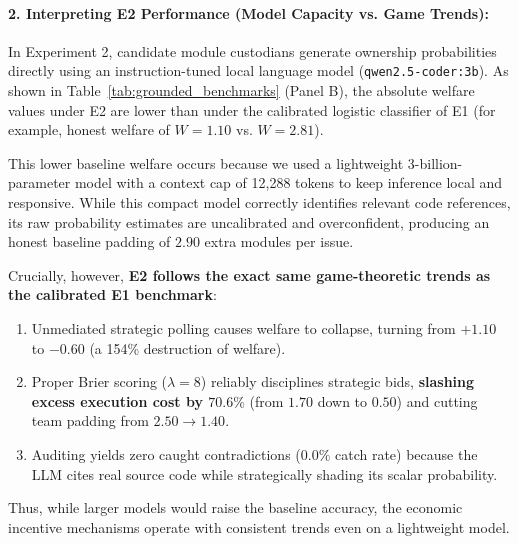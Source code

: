 \documentclass{article}
\theoremstyle{definition}
\begin{document}
\paragraph{2. Interpreting E2 Performance (Model Capacity vs. Game Trends):}
In Experiment 2, candidate module custodians generate ownership probabilities directly using an instruction-tuned local language model (\texttt{qwen2.5-coder:3b}). As shown in Table~\ref{tab:grounded_benchmarks} (Panel B), the absolute welfare values under E2 are lower than under the calibrated logistic classifier of E1 (for example, honest welfare of $W = 1.10$ vs. $W = 2.81$).

This lower baseline welfare occurs because we used a lightweight 3-billion-parameter model with a context cap of 12,288 tokens to keep inference local and responsive. While this compact model correctly identifies relevant code references, its raw probability estimates are uncalibrated and overconfident, producing an honest baseline padding of $2.90$ extra modules per issue.

Crucially, however, \textbf{E2 follows the exact same game-theoretic trends as the calibrated E1 benchmark}:
\begin{enumerate}
    \item Unmediated strategic polling causes welfare to collapse, turning from $+1.10$ to $-0.60$ (a 154\% destruction of welfare).
    \item Proper Brier scoring ($\lambda = 8$) reliably disciplines strategic bids, \textbf{slashing excess execution cost by $70.6\%$} (from $1.70$ down to $0.50$) and cutting team padding from $2.50 \to 1.40$.
    \item Auditing yields zero caught contradictions ($0.0\%$ catch rate) because the LLM cites real source code while strategically shading its scalar probability.
\end{enumerate}
Thus, while larger models would raise the baseline accuracy, the economic incentive mechanisms operate with consistent trends even on a lightweight model.
\end{document}
